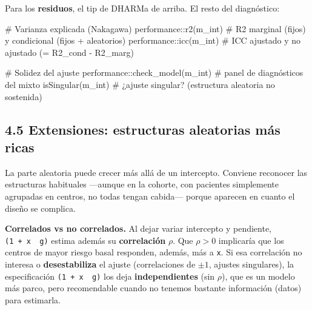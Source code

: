 \documentclass[
  letterpaper,
  DIV=11,
  numbers=noendperiod]{scrartcl}
\newenvironment{Shaded}{\begin{snugshade}}{\end{snugshade}}
\newcommand{\CommentTok}[1]{\textcolor[rgb]{0.37,0.37,0.37}{#1}}
\newcommand{\FunctionTok}[1]{\textcolor[rgb]{0.28,0.35,0.67}{#1}}
\newcommand{\NormalTok}[1]{\textcolor[rgb]{0.00,0.23,0.31}{#1}}
\newcommand{\SpecialCharTok}[1]{\textcolor[rgb]{0.37,0.37,0.37}{#1}}
\begin{document}
\begin{tcolorbox}[enhanced jigsaw, breakable, colframe=quarto-callout-tip-color-frame, left=2mm, arc=.35mm, colbacktitle=quarto-callout-tip-color!10!white, toprule=.15mm, colback=white, coltitle=black, rightrule=.15mm, opacitybacktitle=0.6, title=\textcolor{quarto-callout-tip-color}{\faLightbulb}\hspace{0.5em}{🔧 En R. Bondad de ajuste y solidez de un GLMM}, titlerule=0mm, toptitle=1mm, bottomtitle=1mm, leftrule=.75mm, bottomrule=.15mm, opacityback=0]

Para los \textbf{residuos}, el tip de DHARMa de arriba. El resto del
diagnóstico:

\begin{Shaded}
\begin{Highlighting}[]
\CommentTok{\# Varianza explicada (Nakagawa)}
\NormalTok{performance}\SpecialCharTok{::}\FunctionTok{r2}\NormalTok{(m\_int)        }\CommentTok{\# R2 marginal (fijos) y condicional (fijos + aleatorios)}
\NormalTok{performance}\SpecialCharTok{::}\FunctionTok{icc}\NormalTok{(m\_int)       }\CommentTok{\# ICC ajustado y no ajustado (= R2\_cond {-} R2\_marg)}

\CommentTok{\# Solidez del ajuste}
\NormalTok{performance}\SpecialCharTok{::}\FunctionTok{check\_model}\NormalTok{(m\_int)   }\CommentTok{\# panel de diagnósticos del mixto}
\FunctionTok{isSingular}\NormalTok{(m\_int)                 }\CommentTok{\# ¿ajuste singular? (estructura aleatoria no sostenida)}
\end{Highlighting}
\end{Shaded}

\end{tcolorbox}

\hypertarget{sec-u14-extensiones}{%
\subsection{4.5 Extensiones: estructuras aleatorias más
ricas}\label{sec-u14-extensiones}}

La parte aleatoria puede crecer más allá de un intercepto. Conviene
reconocer las estructuras habituales ---aunque en la cohorte, con
pacientes simplemente agrupadas en centros, no todas tengan cabida---
porque aparecen en cuanto el diseño se complica.

\textbf{Correlados vs no correlados.} Al dejar variar intercepto y
pendiente, \texttt{(1\ +\ x\ \textbar{}\ g)} estima además su
\textbf{correlación} \(\rho\). Que \(\rho>0\) implicaría que los centros
de mayor riesgo basal responden, además, más a \texttt{x}. Si esa
correlación no interesa o \textbf{desestabiliza} el ajuste
(correlaciones de \(\pm1\), ajustes singulares), la especificación
\texttt{(1\ +\ x\ \textbar{}\textbar{}\ g)} los deja
\textbf{independientes} (sin \(\rho\)), que es un modelo más parco, pero
recomendable cuando no tenemos bastante información (datos) para
estimarla.
\end{document}
